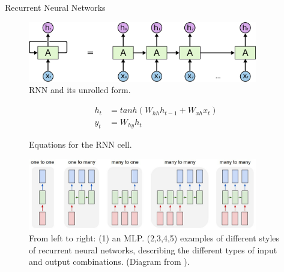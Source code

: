 \documentclass[aspectratio=169, 11pt]{beamer}
\begin{document}
\begin{frame}{Recurrent Neural Networks}
  \begin{figure}[!ht]
    \centering
    \includegraphics[width=100mm]{diagrams/rnn-unrolled.png}
    \caption{RNN and its unrolled form.} 
  \end{figure}
  \begin{figure}[!ht]
    \begin{equation}
    \label{eq:rnn}
    \begin{aligned}
      h_t &= tanh(W_{hh}h_{t-1}+W_{xh}x_t)
    \\
    y_t &= W_{hy}h_t
    \end{aligned}
    \end{equation}
    \caption{Equations for the RNN cell.}
  \end{figure}    
\end{frame}

\begin{frame}
  \begin{figure}[!ht]
    \centering
    \includegraphics[width=100mm]{diagrams/rnn.jpeg}
    \caption{From left to right: (1) an MLP. (2,3,4,5)  examples of different styles of recurrent neural networks, describing the different types of input and output combinations. (Diagram from \cite{karpathy_unreasonable_2015}). \label{rnn_shapes}} 
  \end{figure}
\end{frame}
\end{document}
